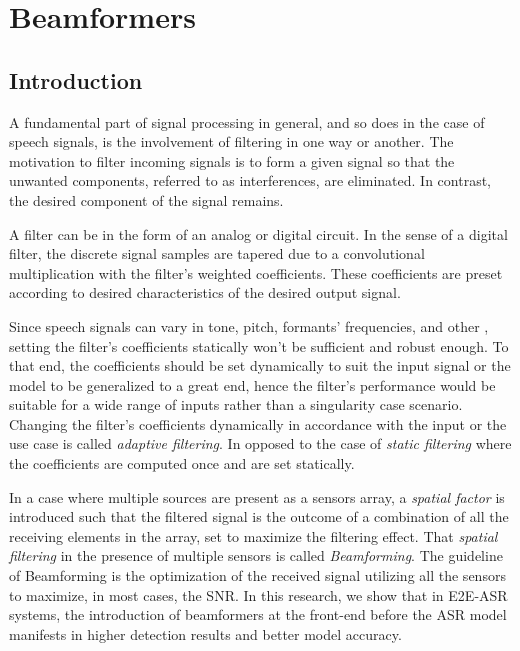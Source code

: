 \chapter{Beamformers}\label{ch:beamformers}
\section{Introduction}
A fundamental part of signal processing in general, 
and so does in the case of speech signals, 
is the involvement of filtering in one way or another.  
The motivation to filter incoming signals 
is to form a given signal so that the unwanted components, 
referred to as interferences, are eliminated. 
In contrast, the desired component of the signal remains.

A filter can be in the form of an analog or digital circuit. 
In the sense of a digital filter, 
the discrete signal samples are tapered 
due to a convolutional multiplication with 
the filter's weighted coefficients.
These coefficients are preset according 
to desired characteristics of the desired output signal.

Since speech signals can vary in tone, pitch, 
formants' frequencies, and other , setting the filter's 
coefficients statically won't be sufficient 
and robust enough.
To that end, the coefficients should be set dynamically
to suit the input signal or the model to be generalized 
to a great end, hence the filter's performance 
would be suitable for a wide range of inputs rather than
a singularity case scenario.
Changing the filter's coefficients dynamically in accordance
with the input or the use case is called \emph{adaptive filtering}.
In opposed to the case of \emph{static filtering} where 
the coefficients are computed once and are set statically. 

In a case where multiple sources are present
as a sensors array, a \emph{spatial factor} is introduced
such that the filtered signal is the outcome of
a combination of all the receiving elements
in the array, set to maximize the filtering effect.
That \emph{spatial filtering} in the presence of
multiple sensors is called \emph{Beamforming}.
The guideline of Beamforming is the optimization of
the received signal utilizing all the sensors
to maximize, in most cases, the SNR.
In this research, we show that in E2E-ASR systems,
the introduction of beamformers at the front-end before
the ASR model manifests in higher detection results
and better model accuracy.

